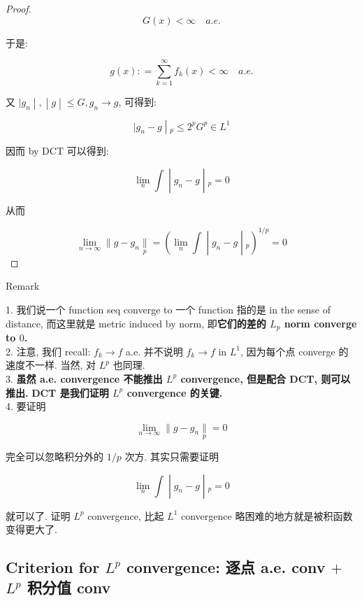 \documentclass{qlnotes-export}
\begin{document}
\begin{proof}
\[G(x) < \infty\quad a.e.\]

于是:

\[g(x): = \sum\limits_{k = 1}^{\infty}f_{k}(x) < \infty\quad a.e.\]

又 \(\left. |g_{n} \middle| , \middle| g \middle| \leq G,g_{n}\rightarrow g \right.\), 可得到:

\[\left. |g_{n} - g \middle| {}_{p} \leq 2^{p}G^{p} \in L^{1} \right.\]

因而 by DCT 可以得到:

\[\left. \lim\limits_{n}\int \middle| g_{n} - g \middle| {}_{p} = 0 \right.\]

从而

\[\left. \lim\limits_{n\rightarrow\infty} \parallel g - g_{n}\underset{p}{\parallel} = (\lim\limits_{n}\int \middle| g_{n} - g \middle| {}_{p})^{1/p} = 0 \right.\]

\end{proof}

\begin{qlremark}{Remark}

1. 我们说一个 function seq converge to 一个 function 指的是 in the sense of distance, 而这里就是 metric induced by norm, 即\textbf{它们的差的 \(L_{p}\) norm converge to \(0\).}\\
2. 注意, 我们 recall: \(f_{k}\rightarrow f\) a.e. 并不说明 \(f_{k}\rightarrow f\) in \(L^{1}\), 因为每个点 converge 的速度不一样. 当然, 对 \(L^{p}\) 也同理.\\
3. \textbf{虽然 a.e. convergence 不能推出 \(L^{p}\) convergence, 但是配合 DCT, 则可以推出.} \textbf{DCT 是我们证明 \(L^{p}\) convergence 的关键.}\\
4. 要证明

\[\lim\limits_{n\rightarrow\infty} \parallel g - g_{n}\underset{p}{\parallel} = 0\]

完全可以忽略积分外的 \(1/p\) 次方. 其实只需要证明

\[\left. \lim\limits_{n}\int \middle| g_{n} - g \middle| {}_{p} = 0 \right.\]

就可以了. 证明 \(L^{p}\) convergence, 比起 \(L^{1}\) convergence 略困难的地方就是被积函数变得更大了.

\end{qlremark}

\subsection{\texorpdfstring{Criterion for \(L^{p}\) convergence: 逐点 a.e. conv \(+\) \(L^{p}\) 积分值 conv}{Criterion for L\^{}\{p\} convergence: 逐点 a.e. conv + L\^{}\{p\} 积分值 conv}}\label{criterion-for-lp-convergence-ux9010ux70b9-a.e.-conv-lp-ux79efux5206ux503c-conv}
\end{document}
